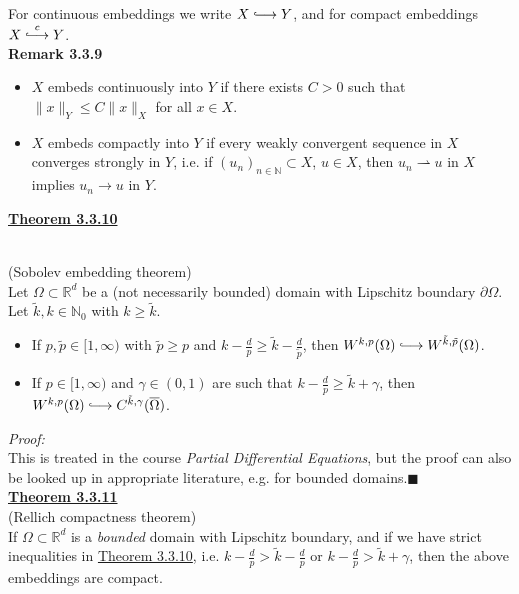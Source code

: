 For continuous embeddings we write $X\longhookrightarrow Y$, and for compact embeddings $X\clonghookrightarrow Y$.\\[11pt]

\textbf{Remark 3.3.9}
\begin{itemize}
	\item[(a)] $X$ embeds continuously into $Y$ if there exists $C>0$ such that $\lVert x\rVert_Y\leq C\lVert x\rVert_X$ for all $x\in X$.
	\item[(b)] $X$ embeds compactly into $Y$ if every weakly convergent sequence in $X$ converges strongly in $Y$, i.e. if $(u_n)_{n\in\mathbb{N}}\subset X$, $u\in X$, then $u_n\rightharpoonup u$ in $X$ implies $u_n\to u$ in $Y$.\\[11pt]
\end{itemize}

\hypertarget{theorem_3_3_10}{\textbf{\underline{Theorem 3.3.10}}}\\
(Sobolev embedding theorem)\\
Let $\Omega\subset\mathbb{R}^d$ be a (not necessarily bounded) domain with Lipschitz boundary $\partial\Omega$. Let $\tilde{k},k\in\mathbb{N}_0$ with $k\geq\tilde{k}$.
\begin{itemize}
	\item[(i)] If $p,\tilde{p}\in[1,\infty)$ with $\tilde{p}\geq p$ and $k-\frac{d}{p}\geq\tilde{k}-\frac{d}{\tilde{p}}$, then $W^{k,p}(\Omega)\longhookrightarrow W^{\tilde{k},\tilde{p}}(\Omega)$.
	\item[(ii)] If $p\in[1,\infty)$ and $\gamma\in(0,1)$ are such that $k-\frac{d}{p}\geq\tilde{k}+\gamma$, then $W^{k,p}(\Omega)\longhookrightarrow C^{\tilde{k},\gamma}(\overline{\Omega})$.\\
\end{itemize}

\textit{Proof:}\\
This is treated in the course \textit{Partial Differential Equations}, but the proof can also be looked up in appropriate literature, e.g. \cite[Kapitel 8, 8.9 Einbettungssatz in Sobolev-R\"aumen, 8.13 Einbettungssatz von Sobolev-R\"aumen in H\"older-R\"aume]{hans_wilhelm_alt} for bounded domains.\hfill$\blacksquare$\\[11pt]

\textbf{\underline{Theorem 3.3.11}}\\
(Rellich compactness theorem)\\
If $\Omega\subset\mathbb{R}^d$ is a \textit{bounded} domain with Lipschitz boundary, and if we have strict inequalities in \hyperlink{theorem_3_3_10}{Theorem 3.3.10}, i.e. $k-\frac{d}{p}>\tilde{k}-\frac{d}{p}$ or $k-\frac{d}{p}>\tilde{k}+\gamma$, then the above embeddings are compact.\\

